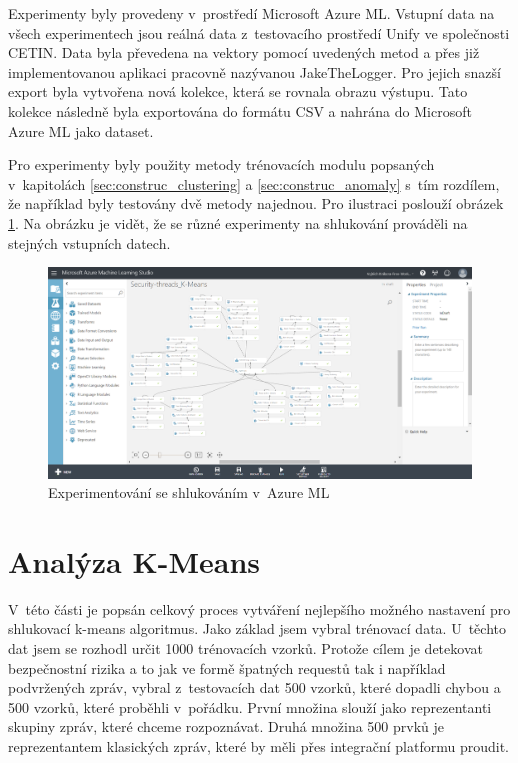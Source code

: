 \documentclass[thesis=M,czech]{FITthesis}[2012/10/20]
\newcommand{\tmpframe}[1]{\fbox{#1}}
\renewcommand{\tmpframe}[1]{#1}
\begin{document}
	Experimenty byly provedeny v~prostředí Microsoft Azure ML. Vstupní data na všech experimentech jsou reálná data z~testovacího prostředí Unify ve společnosti CETIN. Data byla převedena na vektory pomocí uvedených metod a přes již implementovanou aplikaci pracovně nazývanou JakeTheLogger. Pro jejich snazší export byla vytvořena nová kolekce, která se rovnala obrazu výstupu. Tato kolekce následně byla exportována do formátu CSV a nahrána do Microsoft Azure ML jako dataset.
	
	Pro experimenty byly použity metody trénovacích modulu popsaných v~kapitolách \ref{sec:construc_clustering} a \ref{sec:construc_anomaly} s~tím rozdílem, že například byly testovány dvě metody najednou. Pro ilustraci poslouží obrázek \ref{fig:azure-experiment}. Na obrázku je vidět, že se různé experimenty na shlukování prováděli na stejných vstupních datech. 
	
	\begin{figure}[htb]\centering
		\tmpframe{\includegraphics[width=\textwidth]{./img/MSAzureExperimentKMeans}}	
		\caption{Experimentování se shlukováním v~Azure ML}
		\label{fig:azure-experiment}
	\end{figure}
	
	\section{Analýza K-Means}
		V~této části je popsán celkový proces vytváření nejlepšího možného nastavení pro shlukovací k-means algoritmus. Jako základ jsem vybral trénovací data. U~těchto dat jsem se rozhodl určit 1000 trénovacích vzorků. Protože cílem je detekovat bezpečnostní rizika a to jak ve formě špatných requestů tak i například podvržených zpráv, vybral z~testovacích dat 500 vzorků, které dopadli chybou a 500 vzorků, které proběhli v~pořádku. První množina slouží jako reprezentanti skupiny zpráv, které chceme rozpoznávat. Druhá množina 500 prvků je reprezentantem klasických zpráv, které by měli přes integrační platformu proudit.
		
\end{document}
